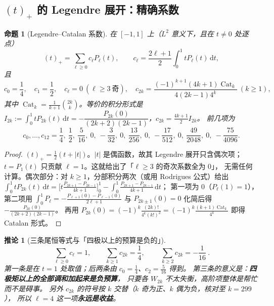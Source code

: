 \documentclass[UTF8,11pt]{ctexart}
\newtheorem{proposition}[theorem]{命题}
\newtheorem{corollary}[theorem]{推论}
\theoremstyle{definition}
\newcommand{\dd}{\,\mathrm{d}}
\begin{document}
\subsection{$(t)_+$ 的 Legendre 展开：精确系数}\label{sec:r21:leg}

\begin{proposition}[Legendre--Catalan 系数]\label{prop:r21cat}
在 $[-1,1]$ 上（$L^2$ 意义下，且在 $t\ne0$ 处逐点）
\begin{equation}\label{eq:r21leg}
(t)_+=\sum_{\ell\ge0}c_\ell P_\ell(t),\qquad
c_\ell=\frac{2\ell+1}2\int_0^1tP_\ell(t)\dd t,
\end{equation}
且
\begin{equation}\label{eq:r21coef}
c_0=\frac14,\quad c_1=\frac12,\quad c_\ell=0\ (\ell\ge3\ \text{奇}),\quad
c_{2k}=\frac{(-1)^{k+1}(4k+1)\operatorname{Cat}_k}{4(2k-1)4^k}\ (k\ge1),
\end{equation}
其中 $\operatorname{Cat}_k=\frac1{k+1}\binom{2k}k$。等价的积分形式是
$I_{2k}:=\int_0^1tP_{2k}(t)\dd t=-\dfrac{P_{2k}(0)}{(2k+2)(2k-1)}$，$c_{2k}=\frac{4k+1}2I_{2k}$。
前几项为
\[
c_0,\dots,c_{12}=\frac14,\ \frac12,\ \frac5{16},\ 0,\ -\frac3{32},\ 0,\ \frac{13}{256},\ 0,\
-\frac{17}{512},\ 0,\ \frac{49}{2048},\ 0,\ -\frac{75}{4096}.
\]
\end{proposition}

\begin{proof}
$(t)_+=\frac12(t+|t|)$。$|t|$ 是偶函数，故其 Legendre 展开只含偶次项；
$t=P_1(t)$ 只贡献 $\ell=1$。这就给出了「$\ell\ge3$ 的奇次系数全为 $0$」，
无需任何计算。偶次部分：对 $k\ge1$，分部积分两次（或用 Rodrigues 公式）给出
$\int_0^1tP_{2k}(t)\dd t=\bigl[t\frac{P_{2k+1}-P_{2k-1}}{4k+1}\bigr]_0^1-\int_0^1\frac{P_{2k+1}-P_{2k-1}}{4k+1}\dd t$；
第一项为 $0$（$P_\ell(1)=1$），第二项用 $\int_0^1P_\ell=-\frac{P_{\ell+1}(0)-P_{\ell-1}(0)}{2\ell+1}$
与 $P_{2k\pm1}(0)=0$ 化简后得 $-\frac{P_{2k}(0)}{(2k+2)(2k-1)}$。
再用 $P_{2k}(0)=(-1)^k\frac{(2k)!}{4^k(k!)^2}=(-1)^k\frac{(k+1)\operatorname{Cat}_k}{4^k}$
即得 Catalan 形式。
\end{proof}

\begin{corollary}[三条尾恒等式与「四极以上的预算是负的」]\label{cor:r21tail}
\[
\sum_{\ell\ge0}c_\ell=1,\qquad \sum_{k\ge1}c_{2k}=\frac14,\qquad
\boxed{\ \sum_{k\ge2}c_{2k}=-\frac1{16}\ } .
\]
第一条是在 $t=1$ 处取值；后两条由 $c_0=\frac14$、$c_2=\frac5{16}$ 得到。
第三条的意义是：\textbf{四极矩以上的全部调和加起来是\emph{负}预算}，
只要各 $W_{2k}$ 不太失衡，高阶项整体是帮忙而不是碍事。
另外 $c_{2k}$ 的符号按 $k$ 交替（$k$ 奇为正、$k$ 偶为负，核对至 $k=299$），
所以 $\ell=4$ 这一项\textbf{永远是收益}。
\end{corollary}
\end{document}
